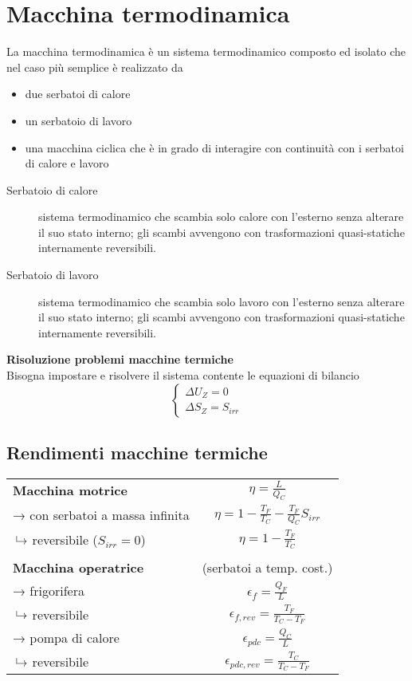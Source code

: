 \section{Macchina termodinamica}
La macchina termodinamica è un sistema termodinamico composto ed isolato che nel caso più semplice è realizzato da
\begin{itemize}
\item due serbatoi di calore
\item un serbatoio di lavoro
\item una macchina ciclica che è in grado di interagire con continuità con i serbatoi di calore e lavoro
\end{itemize}

\begin{description}
\item[Serbatoio di calore]
sistema termodinamico che scambia solo calore con l'esterno senza alterare il suo stato interno;
gli scambi avvengono con trasformazioni quasi-statiche internamente reversibili.
\item[Serbatoio di lavoro]
sistema termodinamico che scambia solo lavoro con l'esterno senza alterare il suo stato interno;
gli scambi avvengono con trasformazioni quasi-statiche internamente reversibili.
\end{description}

\textbf{Risoluzione problemi macchine termiche}\\
Bisogna impostare e risolvere il sistema contente le equazioni di bilancio
\[
    \begin{cases}
    \Delta U_Z = 0 \\
    \Delta S_Z = S_{irr}
    \end{cases}
\]

\subsection{Rendimenti macchine termiche}
{\renewcommand{\arraystretch}{1.5}
\begin{tabular}{p{4cm}c}
\textbf{Macchina motrice} & $\eta = \frac{L}{Q_C}$ \\
→ con serbatoi a massa infinita & $\eta = 1 - \frac{T_F}{T_C} - \frac{T_F}{Q_C}S_{irr}$ \\
\phantom{→}$\put(3,2){\line(0,1){5}}\to$ reversibile ($S_{irr} = 0$) & $\eta = 1 - \frac{T_F}{T_C}$ \\
\\
\textbf{Macchina operatrice} & (serbatoi a temp. cost.) \\
→ frigorifera & $\epsilon_f = \frac{Q_F}{L}$ \\
\phantom{→}$\put(3,2){\line(0,1){5}}\to$ reversibile & $\epsilon_{f,rev} = \frac{T_F}{T_C - T_F}$ \\
→ pompa di calore & $\epsilon_{pdc} = \frac{Q_C}{L}$ \\
\phantom{→}$\put(3,2){\line(0,1){5}}\to$ reversibile & $\epsilon_{pdc,rev} = \frac{T_C}{T_C - T_F}$ \\
\end{tabular}
}
